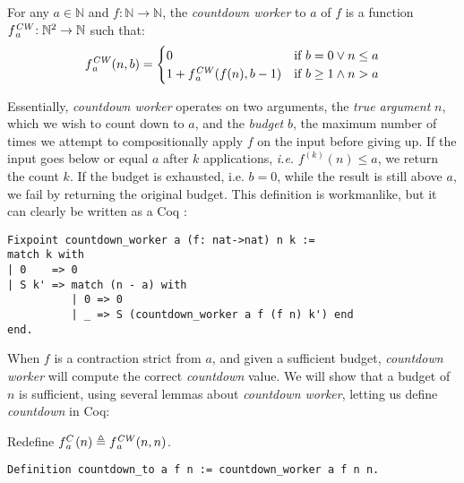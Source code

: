 \begin{defn} \label{defn: countdown-worker}
For any $a\in \mathbb{N}$ and $f: \mathbb{N}\to \mathbb{N}$, the \emph{countdown worker} to $a$ of $f$ is a function $\cdw{f}{a}\ : \mathbb{N}^2\to \mathbb{N}$ such that:
\begin{equation*}
\cdw{f}{a}(n, b) = \begin{cases}
0 & \text{if } b = 0 \vee n\le a \\ 1 +\cdw{f}{a}(f(n), b-1) & \text{if } b \ge 1 \wedge n > a
\end{cases}
\end{equation*}
\end{defn}
Essentially, \emph{countdown worker} operates on two arguments, the \emph{true argument} $n$, which we wish to count down to $a$, and the \emph{budget} $b$, the maximum number of times we attempt 
to compositionally apply $f$ on the input before giving up. If the input goes below or equal $a$ after $k$ applications, \emph{i.e.} $f^{(k)}(n) \le a$, we return the count $k$. If the budget is exhausted, i.e. $b = 0$, while the result is still above $a$, we fail by returning the original budget. This definition is workmanlike, but it can clearly be written as a Coq :
\begin{lstlisting}
Fixpoint countdown_worker a (f: nat->nat) n k :=
match k with
| 0    => 0
| S k' => match (n - a) with
          | 0 => 0
          | _ => S (countdown_worker a f (f n) k') end
end.
\end{lstlisting}
When $f$ is a contraction strict from $a$, and given a sufficient budget, \emph{countdown worker} 
will compute the correct \emph{countdown} value.  We will show that a budget of $n$ is sufficient, using several lemmas about \emph{countdown worker}, letting us define \emph{countdown} in Coq:
\begin{defn} \label{defn: countdown}
Redefine $\cdt{f}{a}(n) \triangleq \cdw{f}{a}(n, n)$.
\begin{lstlisting}
Definition countdown_to a f n := countdown_worker a f n n.
\end{lstlisting}
\end{defn}
